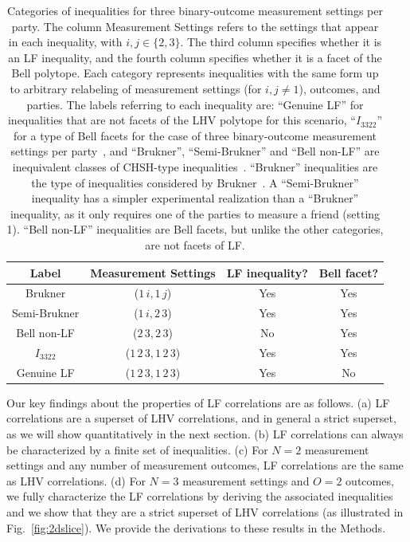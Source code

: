 \documentclass[aps,prx,twocolumn,superscriptaddress]{revtex4-1}
\theoremstyle{plain}
\begin{document}
\begin{table}[t]
\onecolumngrid
\centering
\begin{tabular}{|c|c|c|c|}\hline
\bf Label       & \; \bf Measurement Settings & \bf \;LF inequality?\;  &\;\bf Bell facet?\;\\\hline
Brukner     &($1\,i,1\,j$)                                      & Yes                &Yes\\
Semi-Brukner&($1\,i,2\,3$)                                      & Yes                &Yes\\
Bell non-LF &($2\,3,2\,3$)                                      & No                 &Yes\\
$I_{3322}$  &($1\,2\,3,1\,2\,3$)                                & Yes                &Yes\\
Genuine LF &($1\,2\,3,1\,2\,3$)                                & Yes                &No\\
\hline
\end{tabular}
\caption{\small Categories of inequalities for three binary-outcome measurement settings per party. The column Measurement Settings refers to the settings that appear in each inequality, with $i,j\in\{2,3\}$. The third column specifies whether it is an LF inequality, and the fourth column specifies whether it is a facet of the Bell polytope. Each category represents inequalities with the same form up to arbitrary relabeling of measurement settings (for $i,j \neq 1$), outcomes, and parties. The labels referring to each inequality are: ``Genuine LF'' for inequalities that are not facets of the LHV polytope for this scenario, ``$I_{3322}$'' for a type of Bell facets for the case of three binary-outcome measurement settings per party~\cite{CollinsGisin}, and ``Brukner'', ``Semi-Brukner'' and ``Bell non-LF'' are inequivalent classes of CHSH-type inequalities~\cite{CHSH}. ``Brukner'' inequalities are the type of inequalities considered by Brukner~\cite{BruknerLF}. A ``Semi-Brukner'' inequality has a simpler experimental realization than a ``Brukner'' inequality, as it only requires one of the parties to measure a friend (setting 1). ``Bell non-LF'' inequalities are Bell facets, but unlike the other categories, are not facets of LF.}
\label{table}
\twocolumngrid
\end{table}

Our key findings about the properties of LF correlations are as follows. (a) LF correlations are a superset of LHV correlations, and in general a strict superset, as we will show quantitatively in the next section. (b) LF correlations can always be characterized by a finite set of inequalities. (c) For $N=2$ measurement settings and any number of measurement outcomes, LF correlations are the same as LHV correlations. (d) For $N=3$ measurement settings and $O=2$ outcomes, we fully characterize the LF correlations by deriving the associated inequalities and we show that they are a strict superset of LHV correlations (as illustrated in Fig.\ \ref{fig:2dslice}). We provide the derivations to these results in the Methods.
\end{document}
